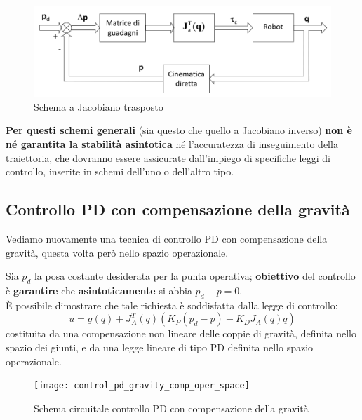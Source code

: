 \begin{figure}[H]
	\centering
	\includegraphics[width=0.7\linewidth]{images/operational_space_control_jac_trasp}
	\caption{Schema a Jacobiano trasposto}
	\label{fig:operationalspacecontroljactrasp}
\end{figure}


\textbf{Per questi schemi generali} (sia questo che quello a Jacobiano inverso) \textbf{non è né garantita la stabilità asintotica} né l’accuratezza di inseguimento della traiettoria, che dovranno essere assicurate dall’impiego di specifiche leggi di controllo, inserite in schemi dell’uno o dell’altro tipo.






\subsection{Controllo PD con compensazione della gravità}\label{section:pd_control_gravity_comp_join_space}
Vediamo nuovamente una tecnica di controllo PD con compensazione della gravità, questa volta però nello spazio operazionale.

Sia $p_d$ la posa costante desiderata per la punta operativa; \textbf{obiettivo} del controllo è \textbf{garantire} che \textbf{asintoticamente} si abbia $p_d - p = 0$.\\
È possibile dimostrare che tale richiesta è soddisfatta dalla legge di controllo:
\begin{equation}\label{eq:pd_gravity_comp_control_operational}
u = g(q) + J_A^T(q)(K_P(p_d - p) - K_DJ_A(q)\dot{q})
\end{equation}
costituita da una compensazione non lineare delle coppie di gravità, definita nello spazio dei giunti, e da una legge lineare di tipo PD definita nello spazio operazionale.


\begin{figure}[H]
	\centering
	\texttt{[image: control\_pd\_gravity\_comp\_oper\_space]}
	\caption{Schema circuitale controllo PD con compensazione della gravità}
	\label{fig:controlpdgravitycompoperspace}
\end{figure}


\vspace{5pt}
